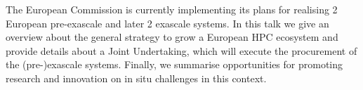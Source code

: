 \license

The European Commission is currently implementing its plans for realising 2 European pre-exascale and later 2 exascale systems. 
%
In this talk we give an overview about the general strategy to grow a European HPC ecosystem and provide details about a Joint Undertaking, which will execute the procurement of the (pre-)exascale systems. 
%
Finally, we summarise opportunities for promoting research and innovation on in situ challenges in this context.
